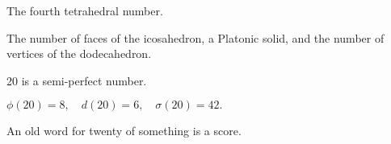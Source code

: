 The fourth tetrahedral number.
\par
The number of faces of the icosahedron, a Platonic solid, and 
the number of vertices of the dodecahedron.
\par
20 is a semi-perfect number.
\par
$ \phi(20)=8, \quad d(20)=6, \quad \sigma(20)=42 . $
\par
An old word for twenty of something is a score.